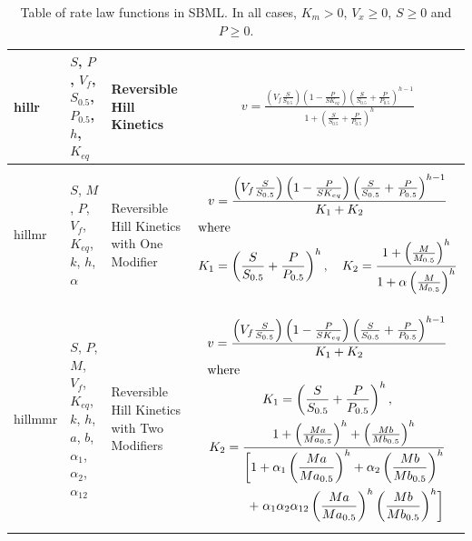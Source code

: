 \documentclass[10pt]{cekarticle}
\begin{document}
\begin{table}[ht]
\begin{tabular}{|m{0.5in}|>{\raggedright}m{0.77in}|>{\raggedright}m{1.5in}|m{3.03in}|}
hillr & $S$, $P$, $V_f$, $S_{0.5}$, $P_{0.5}$, $h$, $K_{eq}$ & Reversible
Hill Kinetics &
\begin{gather*}
v = \frac{\left(V_f \frac{S}{S_{0.5}}
\right) \left(1 - \frac{P}{S K_{eq}} \right)
\left(\frac{S}{S_{0.5}} + \frac{P}{P_{0.5}}\right)^{h-1}}{1 +
\left(\frac{S}{S_{0.5}} + \frac{P}{P_{0.5}}\right)^h}
\end{gather*}
\\ \hline

hillmr & $S$, $M$, $P$, $V_f$, $K_{eq}$, $k$, $h$, $\alpha$ & Reversible Hill
Kinetics with One Modifier &
\begin{gather*}
v = \frac{\left(V_f
\frac{S}{S_{0.5}} \right) \left(1 - \frac{P}{S K_{eq}} \right)
\left(\frac{S}{S_{0.5}} + \frac{P}{P_{0.5}}\right)^{h-1}} {K_1 +
K_2} \\
\intertext{where}
K_1 = \left(\frac{S}{S_{0.5}} +
\frac{P}{P_{0.5}}\right)^h, \quad K_2 = \frac{1 + \left(\frac{M}{M_{0.5}}\right)^h}{1
  + \alpha \left(\frac{M}{M_{0.5}}\right)^h}
\end{gather*}
\\ \hline

hillmmr & $S$, $P$, $M$, $V_f$, $K_{eq}$, $k$, $h$, $a$, $b$, $\alpha_1$, $\alpha_2$, $\alpha_{12}$ &
Reversible Hill Kinetics with Two Modifiers &
\begin{gather*}
v = \frac{\left(V_f
\frac{S}{S_{0.5}} \right) \left(1 - \frac{P}{S K_{eq}} \right)
\left(\frac{S}{S_{0.5}} + \frac{P}{P_{0.5}}\right)^{h-1}} {K_1 +
K_2} \\
\intertext{where}
K_1 = \left(\frac{S}{S_{0.5}} + \frac{P}{P_{0.5}}\right)^h ,\\
K_2 = \frac{1 + \left(\frac{Ma}{Ma_{0.5}}\right)^h + \left( \frac{Mb}{Mb_{0.5}}
\right)^h }{\begin{split}
\biggl[ 1 + \alpha_1 \left(\frac{Ma}{Ma_{0.5}}\right)^h +
\alpha_2 \left(\frac{Mb}{Mb_{0.5}}\right)^h \\
+\; \alpha_1 \alpha_2
\alpha_{12} \left( \frac{Ma}{Ma_{0.5}} \right)^h \left(
  \frac{Mb}{Mb_{0.5}} \right)^h \biggr] \end{split} }
\end{gather*}
\\ \hline

\end{tabular}
\caption{Table of rate law functions in SBML.  In all cases, $K_m > 0$, $V_x \geq 0$, $S
  \geq 0$ and $P \geq 0$.}
\label{tab:ratelaws}
\end{table}
\end{document}
